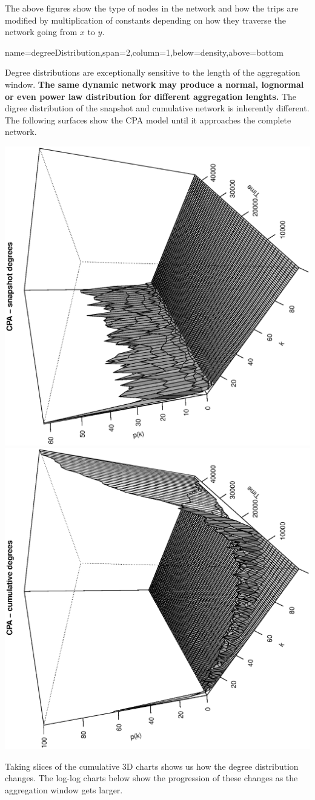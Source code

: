 \documentclass[a0paper,portrait]{baposter}
\begin{document}
\begin{poster}
{The above figures show the type of nodes in the network and how the trips are modified by multiplication of constants depending on how they traverse the network going from $x$ to $y$.

}

{name=degreeDistribution,span=2,column=1,below=density,above=bottom}{
Degree distributions are exceptionally sensitive to the length of the aggregation window. \textbf{The same dynamic network may produce a normal, lognormal or even power law distribution for different aggregation lenghts.} The digree distribution of the snapshot and cumulative network is inherently different. The following surfaces show the CPA model until it approaches the complete network.
\vspace{-0.2em}
\begin{center}
	\includegraphics[angle=-90,width=0.49\linewidth]{CPA_3d_snapshot}
	\includegraphics[angle=-90,width=0.49\linewidth]{CPA_3d_cumulative}
\end{center}
\vspace{-0.2em}
Taking slices of the cumulative 3D charts shows us how the degree distribution changes. The log-log charts below show the progression of these changes as the aggregation window gets larger.
\vspace{-0.2em}
}
\end{poster}
\end{document}
